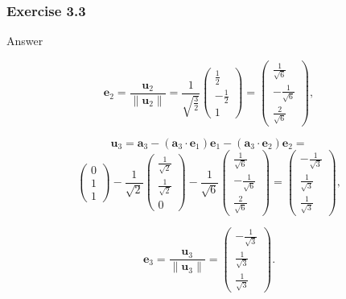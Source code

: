 \documentclass[aspectratio=169, UTF8]{ctexbeamer}
\begin{document}
\begin{frame}
    \frametitle{Exercise 3.3}
    \begin{block}{Answer}

\[
\mathbf{e}_2 = \frac{\mathbf{u}_2}{\|\mathbf{u}_2\|} = \frac{1}{\sqrt{\frac{3}{2}}} \begin{pmatrix} \frac{1}{2} \\ -\frac{1}{2} \\ 1 \end{pmatrix} = \begin{pmatrix} \frac{1}{\sqrt{6}} \\ -\frac{1}{\sqrt{6}} \\ \frac{2}{\sqrt{6}} \end{pmatrix},
\]

\[
\mathbf{u}_3 = \mathbf{a}_3 - (\mathbf{a}_3 \cdot \mathbf{e}_1)\mathbf{e}_1 - (\mathbf{a}_3 \cdot \mathbf{e}_2)\mathbf{e}_2 =\]
        \[
\begin{pmatrix} 0 \\ 1 \\ 1 \end{pmatrix} - \frac{1}{\sqrt{2}} \begin{pmatrix} \frac{1}{\sqrt{2}} \\ \frac{1}{\sqrt{2}} \\ 0 \end{pmatrix} - \frac{1}{\sqrt{6}} \begin{pmatrix} \frac{1}{\sqrt{6}} \\ -\frac{1}{\sqrt{6}} \\ \frac{2}{\sqrt{6}} \end{pmatrix}
= \begin{pmatrix} -\frac{1}{\sqrt{3}} \\ \frac{1}{\sqrt{3}} \\ \frac{1}{\sqrt{3}} \end{pmatrix},
\]

\[
\mathbf{e}_3 = \frac{\mathbf{u}_3}{\|\mathbf{u}_3\|} = \begin{pmatrix} -\frac{1}{\sqrt{3}} \\ \frac{1}{\sqrt{3}} \\ \frac{1}{\sqrt{3}} \end{pmatrix}.
\]
    \end{block}
\end{frame}
\end{document}
